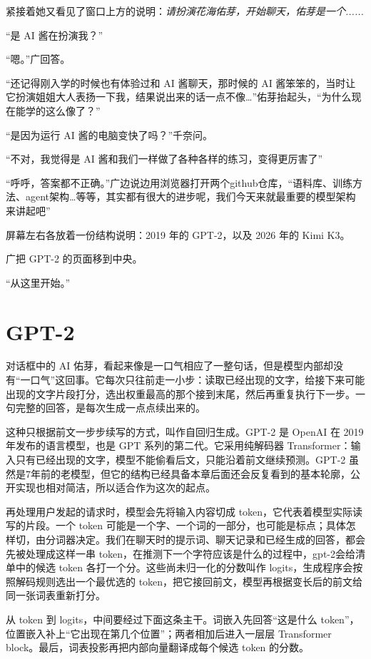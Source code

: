 紧接着她又看见了窗口上方的说明：\textit{请扮演花海佑芽，开始聊天，佑芽是一个......}

“是 AI 酱在扮演我？”

“嗯。”广回答。

“还记得刚入学的时候也有体验过和 AI 酱聊天，那时候的 AI 酱笨笨的，当时让它扮演姐姐大人表扬一下我，结果说出来的话一点不像…”佑芽抬起头，“为什么现在能学的这么像了？”

“是因为运行 AI 酱的电脑变快了吗？”千奈问。

“不对，我觉得是 AI 酱和我们一样做了各种各样的练习，变得更厉害了”

“呼呼，答案都不正确。”广边说边用浏览器打开两个github仓库，“语料库、训练方法、agent架构…等等，其实都有很大的进步呢，我们今天来就最重要的模型架构来讲起吧”

屏幕左右各放着一份结构说明：2019 年的 GPT-2，以及 2026 年的 Kimi K3。

广把 GPT-2 的页面移到中央。

“从这里开始。”

\section{GPT-2}

对话框中的 AI 佑芽，看起来像是一口气相应了一整句话，但是模型内部却没有“一口气”这回事。它每次只往前走一小步：读取已经出现的文字，给接下来可能出现的文字片段打分，选出权重最高的那个接到末尾，然后再重复执行下一步。一句完整的回答，是每次生成一点点续出来的。

 这种只根据前文一步步续写的方式，叫作自回归生成。GPT-2 是 OpenAI 在 2019 年发布的语言模型，也是 GPT 系列的第二代。它采用纯解码器 Transformer：输入只有已经出现的文字，模型不能偷看后文，只能沿着前文继续预测。GPT-2 虽然是7年前的老模型，但它的结构已经具备本章后面还会反复看到的基本轮廓，公开实现也相对简洁，所以适合作为这次的起点。\cite{waterloo-worklog,gpt2}

再处理用户发起的请求时，模型会先将输入内容切成 token，它代表着模型实际读写的片段。一个 token 可能是一个字、一个词的一部分，也可能是标点；具体怎样切，由分词器决定。我们在聊天时的提示词、聊天记录和已经生成的回答，都会先被处理成这样一串 token，在推测下一个字符应该是什么的过程中，gpt-2会给清单中的候选 token 各打一个分。这些尚未归一化的分数叫作 logits，生成程序会按照解码规则选出一个最优选的 token，把它接回前文，模型再根据变长后的前文给同一张词表重新打分。

从 token 到 logits，中间要经过下面这条主干。词嵌入先回答“这是什么 token”，位置嵌入补上“它出现在第几个位置”；两者相加后进入一层层 Transformer block。最后，词表投影再把内部向量翻译成每个候选 token 的分数。

